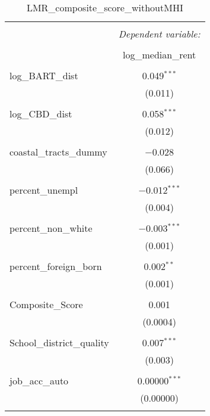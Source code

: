 \documentclass[10pt, letterpaper]{amsart}
\begin{document}
\begin{table}[!htbp] \centering 
  \caption{LMR\_composite\_score\_withoutMHI} 
  \label{} 
  \begin{tabular}{@{\extracolsep{5pt}}lc} 
    \\[-1.8ex]\hline 
    \hline \\[-1.8ex] 
    & \multicolumn{1}{c}{\textit{Dependent variable:}} \\ 
    \cline{2-2} 
    \\[-1.8ex] & log\_median\_rent \\ 
    \hline \\[-1.8ex] 
    log\_BART\_dist & 0.049$^{***}$ \\ 
    & (0.011) \\ 
    & \\ 
    log\_CBD\_dist & 0.058$^{***}$ \\ 
    & (0.012) \\ 
    & \\ 
    coastal\_tracts\_dummy & $-$0.028 \\ 
    & (0.066) \\ 
    & \\ 
    percent\_unempl & $-$0.012$^{***}$ \\ 
    & (0.004) \\ 
    & \\ 
    percent\_non\_white & $-$0.003$^{***}$ \\ 
    & (0.001) \\ 
    & \\ 
    percent\_foreign\_born & 0.002$^{**}$ \\ 
    & (0.001) \\ 
    & \\ 
    Composite\_Score & 0.001 \\ 
    & (0.0004) \\ 
    & \\ 
    School\_district\_quality & 0.007$^{***}$ \\ 
    & (0.003) \\ 
    & \\ 
    job\_acc\_auto & 0.00000$^{***}$ \\ 
    & (0.00000) \\ 
    & \\ 

\end{tabular}
\end{table}
\end{document}
